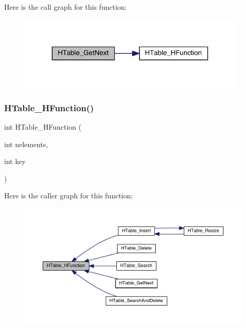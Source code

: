 Here is the call graph for this function\+:\nopagebreak
\begin{figure}[H]
\begin{center}
\leavevmode
\includegraphics[width=308pt]{a00098_a226d34f299950350235ed2f54146c292_cgraph}
\end{center}
\end{figure}
\mbox{\label{a00098_afe255e126a6c4eec5efb11c3691b3155}} 
\subsubsection{\texorpdfstring{H\+Table\+\_\+\+H\+Function()}{HTable\_HFunction()}}
{\footnotesize\ttfamily int H\+Table\+\_\+\+H\+Function (\begin{DoxyParamCaption}\item[{int}]{nelements,  }\item[{int}]{key }\end{DoxyParamCaption})}

Here is the caller graph for this function\+:\nopagebreak
\begin{figure}[H]
\begin{center}
\leavevmode
\includegraphics[width=350pt]{a00098_afe255e126a6c4eec5efb11c3691b3155_icgraph}
\end{center}
\end{figure}
\mbox{\label{a00098_a39853dc7129323e7846d895c9026ad6f}} 
